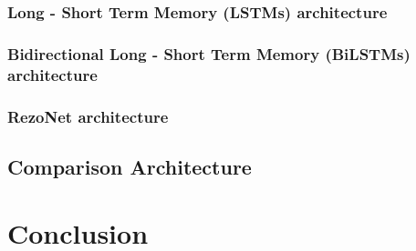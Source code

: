 \documentclass[conference, 10pt]{IEEEtran}
\begin{document}
\subsubsection{Long - Short Term Memory (LSTMs) architecture}
\subsubsection{Bidirectional Long - Short Term Memory (BiLSTMs) architecture}
\subsubsection{RezoNet architecture}
\subsection{Comparison Architecture}

\section{Conclusion}

\end{document}
